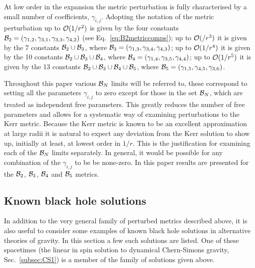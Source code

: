 At low order in the expansion the metric perturbation is fully characterised by a small number of coefficients, $\gamma_{i,j}$. Adopting the notation of \cite{2011PhRvD..84f4016G} the metric perturbation up to ${\cal{O}}(1/r^{2})$ is given by the four constants ${\cal{B}}_{2}=\left(\gamma_{1,2},\gamma_{3,1},\gamma_{3,3},\gamma_{4,2}\right)$ (see Eq.\ \ref{eq:B2metriccomps}); up to ${\cal{O}}(/r^{3})$ it is given by the 7 constants ${\cal{B}}_{2}\cup{\cal{B}}_{3}$, where ${\cal{B}}_{3}=(\gamma_{1,3}, \gamma_{3,4}, \gamma_{4,3})$; up to ${\cal{O}}(1/r^{4})$ it is given by the 10 constants ${\cal{B}}_{2}\cup{\cal{B}}_{3}\cup{\cal{B}}_{4}$, where ${\cal{B}}_{4}=(\gamma_{1,4}, \gamma_{3,5}, \gamma_{4,4})$; up to
${\cal{O}}(1/r^{5})$ it is given by the 13 constants ${\cal{B}}_{2}\cup{\cal{B}}_{3}\cup{\cal{B}}_{4}\cup{\cal{B}}_{5}$, where ${\cal{B}}_{5}=(\gamma_{1,5}, \gamma_{4,5}, \gamma_{3,6})$.

Throughout this paper various ${\cal{B}}_{N}$ limits will be referred to, these correspond to setting all the parameters $\gamma_{i,j}$ to zero except for those in the set ${\cal{B}}_{N}$, which are treated as independent free parameters. This greatly reduces the number of free parameters and allows for a systematic way of examining perturbations to the Kerr metric. Because the Kerr metric is known to be an excellent approximation at large radii it is natural to expect any deviation from the Kerr solution to show up, initially at least, at lowest order in $1/r$. This is the justification for examining each of the ${\cal{B}}_{N}$ limits separately. In general, it would be possible for any combination of the $\gamma_{i,j}$ to be be none-zero. In this paper results are presented for the ${\cal{B}}_{2}$, ${\cal{B}}_{3}$, ${\cal{B}}_{4}$ and ${\cal{B}}_{5}$ metrics.

\subsection{Known black hole solutions}
In addition to the very general family of perturbed metrics described above, it is also useful to consider some examples of known black hole solutions in alternative theories of gravity. In this section a few such solutions are listed. One of these spacetimes (the linear in spin solution to dynamical Chern-Simons gravity, Sec.\ \ref{subsec:CS1}) is a member of the family of solutions given above.


